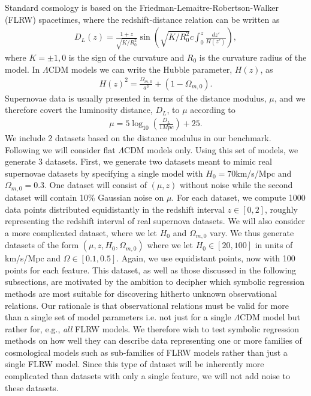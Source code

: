 \documentclass[a4paper,11pt]{article}
\begin{document}
Standard cosmology is based on the Friedman-Lemaitre-Robertson-Walker (FLRW) spacetimes, where the redshift-distance relation can be written as
\begin{align}
	D_L(z) = \frac{1+z}{\sqrt{K/R_0^2}}\sin\left(\sqrt{K/R_0^2}c \int_0^z\frac{dz'}{H(z')} \right) ,
\end{align}
where $K=\pm1,0$ is the sign of the curvature and $R_0$ is the curvature radius of the model. In $\Lambda$CDM models we can write the Hubble parameter, $H(z)$, as
\begin{align}
	H(z)^2 = \frac{\Omega_{m,0}}{a^3} + (1-\Omega_{m,0}).
\end{align}
Supernovae data is usually presented in terms of the distance modulus, $\mu$, and we therefore covert the luminosity distance, $D_L$, to $\mu$ according to
\begin{align}
	\mu = 5\log_{10}\left( \frac{D_L}{1Mpc}\right) +25.
\end{align}
We include 2 datasets based on the distance modulus in our benchmark. Following \cite{physics_motivation, Hubble} we will consider flat $\Lambda$CDM models only. Using this set of models, we generate 3 datasets. First, we generate two datasets meant to mimic real supernovae datasets by specifying a single model with $H_0 = 70$km/s/Mpc and $\Omega_{m,0}=0.3$. One dataset will consist of $(\mu, z)$ without noise while the second dataset will contain 10\% Gaussian noise on $\mu$. For each dataset, we compute 1000 data points distributed equidistantly in the redshift interval $z\in[0,2]$, roughly representing the redshift interval of real supernova datasets. We will also consider a more complicated dataset, where we let $H_0$ and $\Omega_{m,0}$ vary. We thus generate datasets of the form $(\mu, z, H_0, \Omega_{m,0})$ where we let $H_0\in[20,100]$ in units of km/s/Mpc and $\Omega\in[0.1,0.5]$. Again, we use equidistant points, now with 100 points for each feature. This dataset, as well as those discussed in the following subsections, are motivated by the ambition to decipher which symbolic regression methods are most suitable for discovering hitherto unknown observational relations. Our rationale is that observational relations must be valid for more than a single set of model parameters i.e. not just for a single $\Lambda$CDM model but rather for, e.g., \emph{all} FLRW models. We therefore wish to test symbolic regression methods on how well they can describe data representing one or more families of cosmological models such as sub-families of FLRW models rather than just a single FLRW model. Since this type of dataset will be inherently more complicated than datasets with only a single feature, we will not add noise to these datasets.
\end{document}

